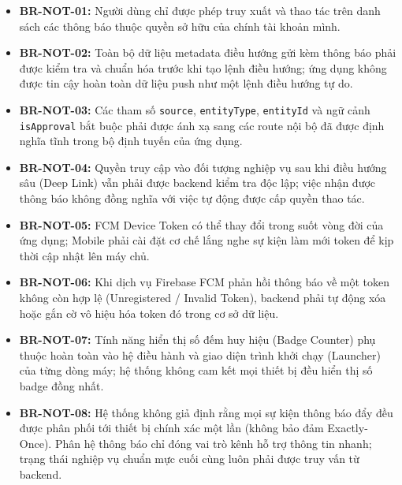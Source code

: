 \begin{itemize}[leftmargin=1.5cm]
    \item \textbf{BR-NOT-01:} Người dùng chỉ được phép truy xuất và thao tác trên danh sách các thông báo thuộc quyền sở hữu của chính tài khoản mình.
    \item \textbf{BR-NOT-02:} Toàn bộ dữ liệu metadata điều hướng gửi kèm thông báo phải được kiểm tra và chuẩn hóa trước khi tạo lệnh điều hướng; ứng dụng không được tin cậy hoàn toàn dữ liệu push như một lệnh điều hướng tự do.
    \item \textbf{BR-NOT-03:} Các tham số \texttt{source}, \texttt{entityType}, \texttt{entityId} và ngữ cảnh \texttt{isApproval} bắt buộc phải được ánh xạ sang các route nội bộ đã được định nghĩa tĩnh trong bộ định tuyến của ứng dụng.
    \item \textbf{BR-NOT-04:} Quyền truy cập vào đối tượng nghiệp vụ sau khi điều hướng sâu (Deep Link) vẫn phải được backend kiểm tra độc lập; việc nhận được thông báo không đồng nghĩa với việc tự động được cấp quyền thao tác.
    \item \textbf{BR-NOT-05:} FCM Device Token có thể thay đổi trong suốt vòng đời của ứng dụng; Mobile phải cài đặt cơ chế lắng nghe sự kiện làm mới token để kịp thời cập nhật lên máy chủ.
    \item \textbf{BR-NOT-06:} Khi dịch vụ Firebase FCM phản hồi thông báo về một token không còn hợp lệ (Unregistered / Invalid Token), backend phải tự động xóa hoặc gắn cờ vô hiệu hóa token đó trong cơ sở dữ liệu.
    \item \textbf{BR-NOT-07:} Tính năng hiển thị số đếm huy hiệu (Badge Counter) phụ thuộc hoàn toàn vào hệ điều hành và giao diện trình khởi chạy (Launcher) của từng dòng máy; hệ thống không cam kết mọi thiết bị đều hiển thị số badge đồng nhất.
    \item \textbf{BR-NOT-08:} Hệ thống không giả định rằng mọi sự kiện thông báo đẩy đều được phân phối tới thiết bị chính xác một lần (không bảo đảm Exactly-Once). Phân hệ thông báo chỉ đóng vai trò kênh hỗ trợ thông tin nhanh; trạng thái nghiệp vụ chuẩn mực cuối cùng luôn phải được truy vấn từ backend.
\end{itemize}
